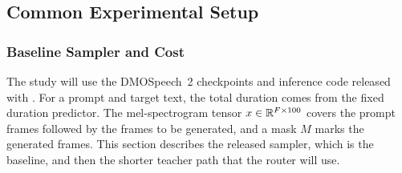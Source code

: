 \subsection{Common Experimental Setup}
\label{sec:setup}

\subsubsection{Baseline Sampler and Cost}
\label{sec:baseline}

The study will use the DMOSpeech~2 checkpoints and inference code released with \textcite{li2025dmospeech2}. For a prompt and target text, the total duration comes from the fixed duration predictor. The mel-spectrogram tensor $x\in\mathbb{R}^{F\times 100}$ covers the prompt frames followed by the frames to be generated, and a mask $M$ marks the generated frames. This section describes the released sampler, which is the baseline, and then the shorter teacher path that the router will use.

